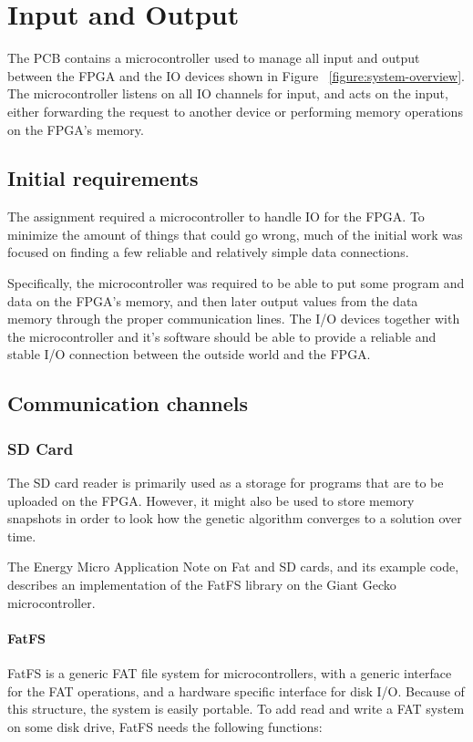 \section{Input and Output}
The PCB contains a microcontroller used to manage all input and output between the FPGA and the IO devices shown in Figure ~\vref{figure:system-overview}.
The microcontroller listens on all IO channels for input, and acts on the input, either forwarding the request to another device or performing memory operations on the FPGA's memory.

\subsection{Initial requirements}
The assignment required a microcontroller to handle IO for the FPGA.
To minimize the amount of things that could go wrong, much of the initial work was focused on finding a few reliable and relatively simple data connections.

Specifically, the microcontroller was required to be able to put some program and data on the FPGA's memory, and then later output values from the data memory through the proper communication lines.
The I/O devices together with the microcontroller and it's software should be able to provide a reliable and stable I/O connection between the outside world and the FPGA.

\subsection{Communication channels}
\subsubsection{SD Card}
The SD card reader is primarily used as a storage for programs that are to be uploaded on the FPGA.
However, it might also be used to store memory snapshots in order to look how the genetic algorithm converges to a solution over time.

The Energy Micro Application Note on Fat and SD cards, and its example code, describes an implementation of the FatFS library on the Giant Gecko microcontroller.\cite{an0030}

\paragraph{FatFS}\cite{fatfs-web}

FatFS is a generic FAT file system for microcontrollers, with a generic interface for the FAT operations, and a hardware specific interface for disk I/O.
Because of this structure, the system is easily portable.
To add read and write a FAT system on some disk drive, FatFS needs the following functions:

